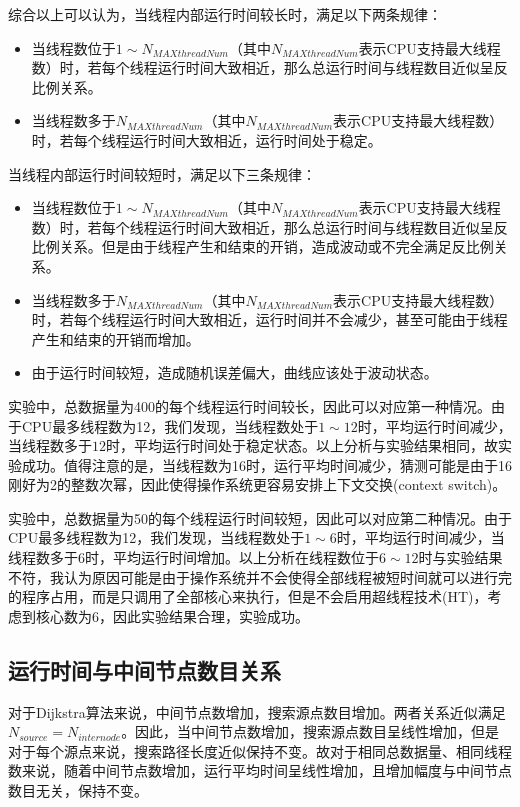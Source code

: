 \documentclass[UTF8]{ctexart}
\begin{document}
综合以上可以认为，当线程内部运行时间较长时，满足以下两条规律：
\begin{itemize}
    \item 当线程数位于$1 \sim N_{MAXthreadNum}$（其中$N_{MAXthreadNum}$表示CPU支持最大线程数）时，若每个线程运行时间大致相近，那么总运行时间与线程数目近似呈反比例关系。
    \item 当线程数多于$ N_{MAXthreadNum}$（其中$N_{MAXthreadNum}$表示CPU支持最大线程数）时，若每个线程运行时间大致相近，运行时间处于稳定。
\end{itemize}

当线程内部运行时间较短时，满足以下三条规律：
\begin{itemize}
    \item 当线程数位于$1 \sim N_{MAXthreadNum}$（其中$N_{MAXthreadNum}$表示CPU支持最大线程数）时，若每个线程运行时间大致相近，那么总运行时间与线程数目近似呈反比例关系。但是由于线程产生和结束的开销，造成波动或不完全满足反比例关系。
    \item 当线程数多于$ N_{MAXthreadNum}$（其中$N_{MAXthreadNum}$表示CPU支持最大线程数）时，若每个线程运行时间大致相近，运行时间并不会减少，甚至可能由于线程产生和结束的开销而增加。
    \item 由于运行时间较短，造成随机误差偏大，曲线应该处于波动状态。
\end{itemize}

实验中，总数据量为400的每个线程运行时间较长，因此可以对应第一种情况。由于CPU最多线程数为12，我们发现，当线程数处于$1 \sim 12$时，平均运行时间减少，当线程数多于$12$时，平均运行时间处于稳定状态。以上分析与实验结果相同，故实验成功。值得注意的是，当线程数为16时，运行平均时间减少，猜测可能是由于16刚好为2的整数次幂，因此使得操作系统更容易安排上下文交换(context switch)。

实验中，总数据量为50的每个线程运行时间较短，因此可以对应第二种情况。由于CPU最多线程数为12，我们发现，当线程数处于$1 \sim 6$时，平均运行时间减少，当线程数多于$6$时，平均运行时间增加。以上分析在线程数位于$6 \sim 12$时与实验结果不符，我认为原因可能是由于操作系统并不会使得全部线程被短时间就可以进行完的程序占用，而是只调用了全部核心来执行，但是不会启用超线程技术(HT)，考虑到核心数为6，因此实验结果合理，实验成功。

\subsection{运行时间与中间节点数目关系}
对于Dijkstra算法来说，中间节点数增加，搜索源点数目增加。两者关系近似满足$N_{source}=N_{internode}$。因此，当中间节点数增加，搜索源点数目呈线性增加，但是对于每个源点来说，搜索路径长度近似保持不变。故对于相同总数据量、相同线程数来说，随着中间节点数增加，运行平均时间呈线性增加，且增加幅度与中间节点数目无关，保持不变。
\end{document}
